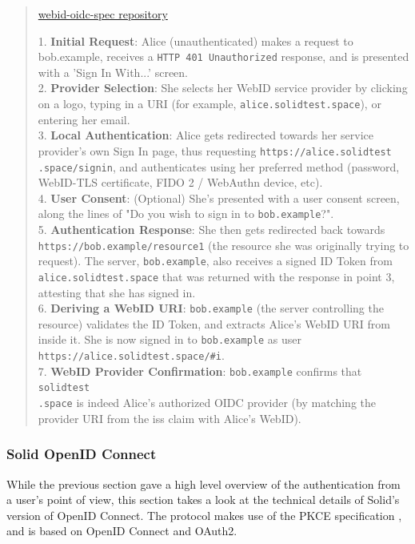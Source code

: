 \begin{quote}{\href{https://github.com/solid/webid-oidc-spec}{webid-oidc-spec repository}}

    1. \textbf{Initial Request}: Alice (unauthenticated) makes a request to bob.example, receives a \texttt{HTTP 401 Unauthorized} response, and is presented with a 'Sign In With...' screen.\\
    
    2. \textbf{Provider Selection}: She selects her WebID service provider by clicking on a logo, typing in a URI (for example, \texttt{alice.solidtest.space}), or entering her email.\\
    
    3. \textbf{Local Authentication}: Alice gets redirected towards her service provider's own Sign In page, thus requesting \texttt{https://alice.solidtest\\.space/signin}, and authenticates using her preferred method (password, WebID-TLS certificate, FIDO 2 / WebAuthn device, etc).\\
    
    4. \textbf{User Consent}: (Optional) She's presented with a user consent screen, along the lines of "Do you wish to sign in to \texttt{bob.example}?".\\
    
    5. \textbf{Authentication Response}: She then gets redirected back towards \texttt{https://bob.example/resource1} (the resource she was originally trying to request). The server, \texttt{bob.example}, also receives a signed ID Token from \texttt{alice.solidtest.space} that was returned with the response in point 3, attesting that she has signed in.\\
    
    6. \textbf{Deriving a WebID URI}: \texttt{bob.example} (the server controlling the resource) validates the ID Token, and extracts Alice's WebID URI from inside it. She is now signed in to \texttt{bob.example} as user\\ \texttt{https://alice.solidtest.space/\#i}.\\
    
    7. \textbf{WebID Provider Confirmation}: \texttt{bob.example} confirms that \texttt{solidtest\\.space} is indeed Alice's authorized OIDC provider (by matching the provider URI from the iss claim with Alice's WebID).
\end{quote}

\subsubsection{Solid OpenID Connect}
\label{sec:solid-oidc}
While the previous section gave a high level overview of the authentication from a user's point of view, this section takes a look at the technical details of Solid's version of OpenID Connect. The protocol makes use of the \acrshort{PKCE} specification \citep{pkce}, and is based on OpenID Connect and OAuth2.

